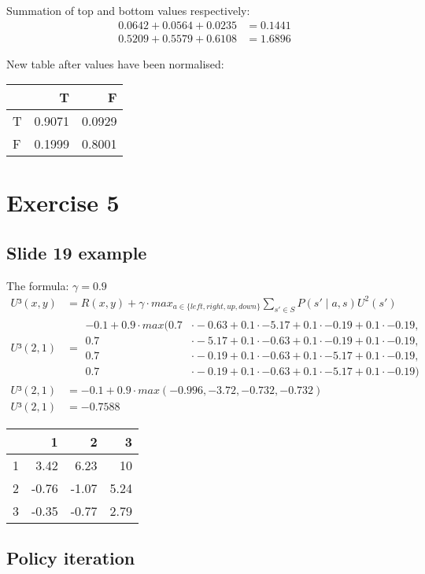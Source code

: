 \documentclass[colorlinks=true,linkcolor=blue]{article}
\begin{document}
Summation of top and bottom values respectively:
\begin{align*}
0.0642 + 0.0564 + 0.0235 &= 0.1441\\
0.5209 + 0.5579 + 0.6108 &= 1.6896
\end{align*}

New table after values have been normalised:
\begin{center}
\begin{tabular}{l|rr}
 & T & F\\
\hline
T & 0.9071 & 0.0929\\
F & 0.1999 & 0.8001\\
\end{tabular}
\end{center}
\section{Exercise 5}
\label{sec-5}
\subsection{Slide 19 example}
\label{sec-5-1}

The formula: $\gamma = 0.9$
\begin{align*}
U³(x,y) &= R(x,y) + \gamma \cdot max_{a \in \{left,right,up,down\} } \sum_{s'\in S} P(s' \mid a,s) U^2(s')\\
U³(2,1) &=
\begin{aligned}
  -0.1 + 0.9 \cdot max(0.7 &\cdot -0.63 + 0.1 \cdot -5.17 + 0.1 \cdot -0.19 + 0.1 \cdot -0.19,\\ 
  0.7 &\cdot -5.17 + 0.1 \cdot -0.63 + 0.1 \cdot -0.19 + 0.1 \cdot -0.19,\\ 
  0.7 &\cdot -0.19 + 0.1 \cdot -0.63 + 0.1 \cdot -5.17 + 0.1 \cdot -0.19,\\ 
  0.7 &\cdot -0.19 + 0.1 \cdot -0.63 + 0.1 \cdot -5.17 + 0.1 \cdot -0.19)
\end{aligned}
\\
U³(2,1) &= -0.1 + 0.9 \cdot max(-0.996,-3.72,-0.732,-0.732)\\
U³(2,1) &= -0.7588
\end{align*}
\begin{center}
\begin{tabular}{r|r|r|r|}
 & 1 & 2 & 3\\
\hline
1 & 3.42 & 6.23 & 10\\
\hline
2 & -0.76 & -1.07 & 5.24\\
\hline
3 & -0.35 & -0.77 & 2.79\\
\hline
\end{tabular}
\end{center}

\subsection{Policy iteration}
\label{sec-5-2}
\end{document}
